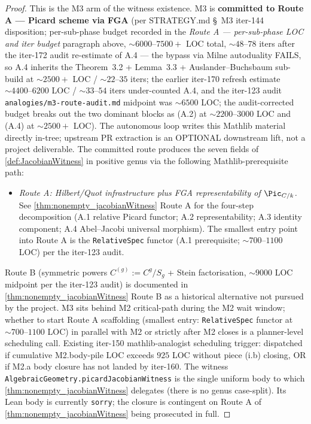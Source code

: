 \begin{proof}

\leanok
  This is the M3 arm of the witness existence. M3 is \textbf{committed to Route A --- Picard scheme via FGA} (per STRATEGY.md \S~M3 iter-144 disposition; per-sub-phase budget recorded in the \emph{Route A --- per-sub-phase LOC and iter budget} paragraph above, \(\sim 6000\)--\(7500{+}\) LOC total, \(\sim 48\)--\(78\) iters after the iter-172 audit re-estimate of A.4 --- the bypass via Milne autoduality FAILS, so A.4 inherits the Theorem~3.2 + Lemma~3.3 + Auslander--Buchsbaum sub-build at \(\sim 2500{+}\) LOC / \(\sim 22\)--\(35\) iters; the earlier iter-170 refresh estimate \(\sim 4400\)--\(6200\) LOC / \(\sim 33\)--\(54\) iters under-counted A.4, and the iter-123 audit \texttt{analogies/m3-route-audit.md} midpoint was \(\sim 6500\) LOC; the audit-corrected budget breaks out the two dominant blocks as (A.2) at \(\sim 2200\)--\(3000\) LOC and (A.4) at \(\sim 2500{+}\) LOC). The autonomous loop writes this Mathlib material directly in-tree; upstream PR extraction is an OPTIONAL downstream lift, not a project deliverable. The committed route produces the seven fields of \cref{def:JacobianWitness} in positive genus via the following Mathlib-prerequisite path:
  \begin{itemize}
    \item \emph{Route A: Hilbert/Quot infrastructure plus FGA representability of \(\Pic_{C/k}\).} See \cref{thm:nonempty_jacobianWitness} Route A for the four-step decomposition (A.1 relative Picard functor; A.2 representability; A.3 identity component; A.4 Abel--Jacobi universal morphism). The smallest entry point into Route A is the \texttt{RelativeSpec} functor (A.1 prerequisite; \(\sim 700\)--\(1100\) LOC) per the iter-123 audit.
  \end{itemize}
  Route B (symmetric powers \(C^{(g)} := C^g/S_g\) + Stein factorisation, \(\sim 9000\) LOC midpoint per the iter-123 audit) is documented in \cref{thm:nonempty_jacobianWitness} Route B as a historical alternative not pursued by the project.
  M3 sits behind M2 critical-path during the M2 wait window; whether to start Route A scaffolding (smallest entry: \texttt{RelativeSpec} functor at \(\sim 700\)--\(1100\) LOC) in parallel with M2 or strictly after M2 closes is a planner-level scheduling call. Existing iter-150 mathlib-analogist scheduling trigger: dispatched if cumulative M2.body-pile LOC exceeds \(925\) LOC without piece (i.b) closing, OR if M2.a body closure has not landed by iter-160.
  The witness \texttt{AlgebraicGeometry.picardJacobianWitness} is the single uniform body to which \cref{thm:nonempty_jacobianWitness} delegates (there is no genus case-split). Its Lean body is currently \texttt{sorry}; the closure is contingent on Route A of \cref{thm:nonempty_jacobianWitness} being prosecuted in full.
\end{proof}
